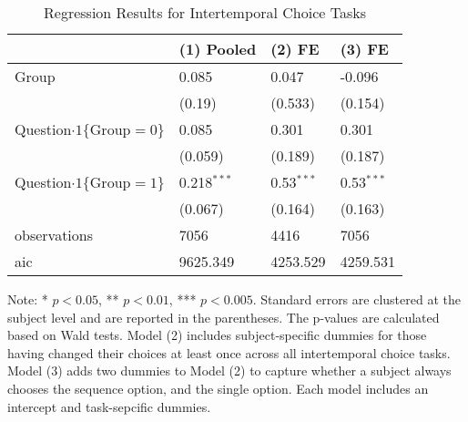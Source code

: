 \documentclass[12pt]{article}
\begin{document}
\begin{table}
    \caption{Regression Results for Intertemporal Choice Tasks}
    \vspace*{12pt}
    \centering

      \begin{tabular}{llll}
\hline
 & (1) Pooled & (2) FE & (3) FE \\
\hline
Group & 0.085 & 0.047 & -0.096 \\
 & (0.19) & (0.533) & (0.154) \\
Question$\cdot1\{\text{Group}=0\}$ & 0.085 & 0.301 & 0.301 \\
 & (0.059) & (0.189) & (0.187) \\
Question$\cdot1\{\text{Group}=1\}$ & 0.218$^{***}$ & 0.53$^{***}$ & 0.53$^{***}$ \\
 & (0.067) & (0.164) & (0.163) \\\hline

observations & 7056 & 4416 & 7056 \\
aic & 9625.349 & 4253.529 & 4259.531 \\
\hline
\end{tabular}

    \vspace*{4pt}
    \centering
    \begin{minipage}{0.85\textwidth}
    {\par\footnotesize Note: * $p<0.05$, ** $p<0.01$, *** $p<0.005$. Standard errors are clustered at the subject level and are reported in the parentheses. The p-values are calculated based on Wald tests. Model (2) includes subject-specific dummies for those having changed their choices at least once across all intertemporal choice tasks. Model (3) adds two dummies to Model (2) to capture whether a subject always chooses the sequence option, and the single option. Each model includes an intercept and task-sepcific dummies.}
    \end{minipage}
    \label{tab:exp3_reg_intertemporal_choice}
\end{table}
\end{document}
